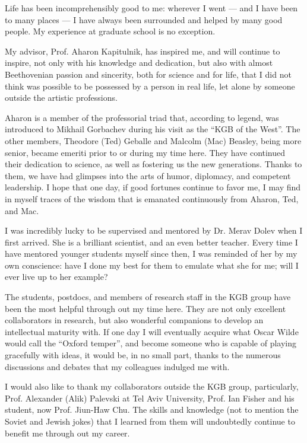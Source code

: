 Life has been incomprehensibly good to me: wherever I went --- and I have been to many places --- I have always been surrounded and helped by many good people. My experience at graduate school is no exception.

My advisor, Prof. Aharon Kapitulnik, has inspired me, and will continue to inspire, not only with his knowledge and dedication, but also with almost Beethovenian passion and sincerity, both for science and for life, that I did not think was possible to be possessed by a person in real life, let alone by someone outside the artistic professions.

Aharon is a member of the professorial triad that, according to legend, was introduced to Mikhail Gorbachev during his visit as the ``KGB of the West''. The other members, Theodore (Ted) Geballe and Malcolm (Mac) Beasley, being more senior, became emeriti prior to or during my time here. They have continued their dedication to science, as well as fostering us the new generations. Thanks to them, we have had glimpses into the arts of humor, diplomacy, and competent leadership. I hope that one day, if good fortunes continue to favor me, I may find in myself traces of the wisdom that is emanated continuously from Aharon, Ted, and Mac.

I was incredibly lucky to be supervised and mentored by Dr. Merav Dolev when I first arrived. She is a brilliant scientist, and an even better teacher. Every time I have mentored younger students myself since then, I was reminded of her by my own conscience: have I done my best for them to emulate what she for me; will I ever live up to her example?

The students, postdocs, and members of research staff in the KGB group have been the most helpful through out my time here. They are not only excellent collaborators in research, but also wonderful companions to develop an intellectual maturity with. If one day I will eventually acquire what Oscar Wilde would call the ``Oxford temper'', and become someone who is capable of playing gracefully with ideas, it would be, in no small part, thanks to the numerous discussions and debates that my colleagues indulged me with.

I would also like to thank my collaborators outside the KGB group, particularly, Prof. Alexander (Alik) Palevski at Tel Aviv University, Prof. Ian Fisher and his student, now Prof. Jiun-Haw Chu. The skills and knowledge (not to mention the Soviet and Jewish jokes) that I learned from them will undoubtedly continue to benefit me through out my career. 


